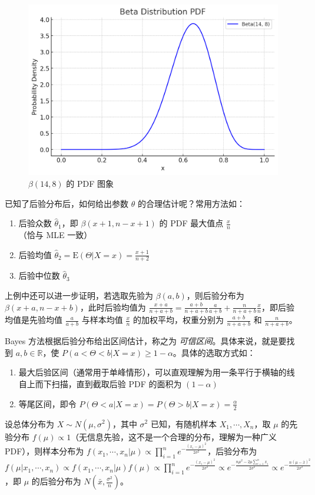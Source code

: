 \documentclass[../main.tex]{subfiles}
\begin{document}
\begin{figure}[!ht]
    \centering
    \includegraphics[scale=0.4]{figures/beta(14,8).png}
    \caption{$\beta(14,8)$ 的 PDF 图象}
    \label{fig:6.5.1}
\end{figure}

已知了后验分布后，如何给出参数 $\theta$ 的合理估计呢？常用方法如：
\begin{enumerate}
    \item 后验众数 $\hat\theta_1$，即 $\beta(x+1,n-x+1)$ 的 PDF 最大值点 $\frac xn$（恰与 MLE 一致）
    \item 后验均值 $\hat\theta_2=\mathrm E(\Theta|X=x)=\frac{x+1}{n+2}$
    \item 后验中位数 $\hat\theta_3$
\end{enumerate}

上例中还可以进一步证明，若选取先验为 $\beta(a,b)$，则后验分布为 $\beta(x+a,n-x+b)$，此时后验均值为 $\frac{x+a}{n+a+b}=\frac{a+b}{n+a+b}\frac{a}{a+b}+\frac{n}{n+a+b}\frac{x}{n}$，即后验均值是先验均值 $\frac a{a+b}$ 与样本均值 $\frac xn$ 的加权平均，权重分别为 $\frac{a+b}{n+a+b}$ 和 $\frac{n}{n+a+b}$。

Bayes 方法根据后验分布给出区间估计，称之为 \emph{可信区间}。具体来说，就是要找到 $a,b\in\mathbb R$，使 $P(a<\Theta<b|X=x)\geq1-\alpha$。具体的选取方式如：
\begin{enumerate}
    \item 最大后验区间（通常用于单峰情形），可以直观理解为用一条平行于横轴的线自上而下扫描，直到截取后验 PDF 的面积为 $(1-\alpha)$
    \item 等尾区间，即令 $P(\Theta<a|X=x)=P(\Theta>b|X=x)=\frac\alpha2$
\end{enumerate}

\begin{example}
    设总体分布为 $X\sim N(\mu,\sigma^2)$，其中 $\sigma^2$ 已知，有随机样本 $X_1,\cdots,X_n$，取 $\mu$ 的先验分布 $f(\mu)\propto 1$（无信息先验，这不是一个合理的分布，理解为一种广义 PDF），则样本分布为 $f(x_1,\cdots,x_n|\mu)\propto\prod_{i=1}^ne^{-\frac{(x_i-\mu)^2}{2\sigma^2}}$，后验分布为 $f(\mu|x_1,\cdots,x_n)\propto f(x_1,\cdots,x_n|\mu)f(\mu)\propto\prod_{i=1}^ne^{-\frac{(x_i-\mu)^2}{2\sigma^2}}\propto e^{-\frac{n\mu^2-2\mu\sum_{i=1}^nx_i}{2\sigma^2}}\propto e^{-\frac{n(\mu-\bar x)^2}{2\sigma^2}}$，即 $\mu$ 的后验分布为 $N(\bar x,\frac{\sigma^2}{n})$。
\end{example}
\end{document}

